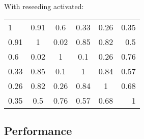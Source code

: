 \documentclass[a4paper, titlepage, 12pt]{article} %
\begin{document}
    With reseeding activated:\\
    \begin{tabular}{ l c c c c r }
     1 & 0.91 & 0.6 & 0.33 & 0.26 & 0.35 \\
     0.91 & 1 & 0.02 & 0.85 & 0.82 & 0.5 \\
     0.6 & 0.02 & 1 & 0.1 & 0.26 & 0.76 \\
     0.33 & 0.85 & 0.1 & 1 & 0.84 & 0.57 \\
     0.26 & 0.82 & 0.26 & 0.84 & 1 & 0.68 \\
     0.35 & 0.5 & 0.76 & 0.57 & 0.68 & 1 \\
    \end{tabular}
    
   \subsection{Performance}
  
\end{document}
